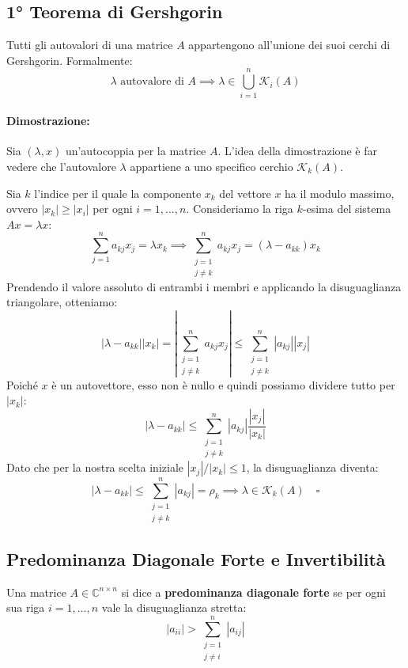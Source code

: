 \documentclass[a4paper,12pt]{article}
\begin{document}
	\subsection{1° Teorema di Gershgorin}
	\begin{tcolorbox}[title=1° Teorema di Gershgorin, colback=blue!5!white, colframe=blue!75!black]
		Tutti gli autovalori di una matrice $A$ appartengono all'unione dei suoi cerchi di Gershgorin. Formalmente:
		\begin{equation}
			\lambda \text{ autovalore di } A \implies \lambda \in \bigcup_{i=1}^{n} \mathcal{K}_i(A)
		\end{equation}
	\end{tcolorbox}
	
	\paragraph{Dimostrazione:}
	Sia $(\lambda, x)$ un'autocoppia per la matrice $A$. L'idea della dimostrazione è far vedere che l'autovalore $\lambda$ appartiene a uno specifico cerchio $\mathcal{K}_k(A)$.
	
	Sia $k$ l'indice per il quale la componente $x_k$ del vettore $x$ ha il modulo massimo, ovvero $|x_k| \ge |x_i|$ per ogni $i=1,\dots,n$.
	Consideriamo la riga $k$-esima del sistema $Ax = \lambda x$:
	\[
	\sum_{j=1}^{n} a_{kj} x_j = \lambda x_k \implies \sum_{\substack{j=1 \\ j \neq k}}^{n} a_{kj} x_j = (\lambda - a_{kk}) x_k
	\]
	Prendendo il valore assoluto di entrambi i membri e applicando la disuguaglianza triangolare, otteniamo:
	\[
	|\lambda - a_{kk}| |x_k| = \left| \sum_{\substack{j=1 \\ j \neq k}}^{n} a_{kj} x_j \right| \le \sum_{\substack{j=1 \\ j \neq k}}^{n} |a_{kj}| |x_j|
	\]
	Poiché $x$ è un autovettore, esso non è nullo e quindi possiamo dividere tutto per $|x_k|$:
	\[
	|\lambda - a_{kk}| \le \sum_{\substack{j=1 \\ j \neq k}}^{n} |a_{kj}| \frac{|x_j|}{|x_k|}
	\]
	Dato che per la nostra scelta iniziale $|x_j| / |x_k| \le 1$, la disuguaglianza diventa:
	\begin{equation}
		|\lambda - a_{kk}| \le \sum_{\substack{j=1 \\ j \neq k}}^{n} |a_{kj}| = \rho_k \implies \lambda \in \mathcal{K}_k(A) \quad \square
	\end{equation}
	
	\subsection{Predominanza Diagonale Forte e Invertibilità}
	\begin{tcolorbox}[title=Definizione: Predominanza Diagonale Forte, colback=white]
		Una matrice $A \in \mathbb{C}^{n \times n}$ si dice a \textbf{predominanza diagonale forte} se per ogni sua riga $i=1,\dots,n$ vale la disuguaglianza stretta:
		\begin{equation}
			|a_{ii}| > \sum_{\substack{j=1 \\ j \neq i}}^{n} |a_{ij}|
		\end{equation}
	\end{tcolorbox}
	
\end{document}
